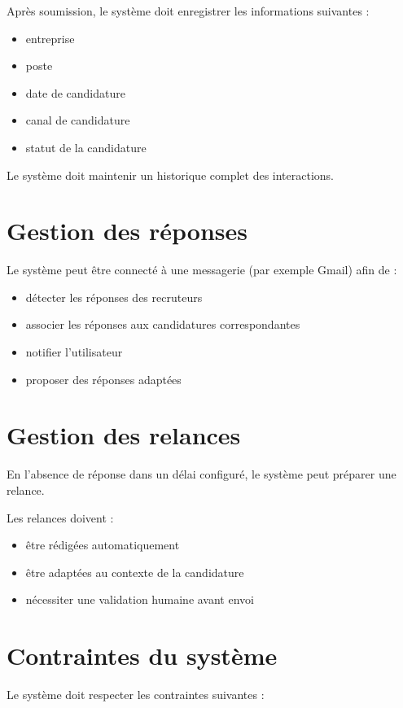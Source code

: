 \documentclass[11pt,a4paper]{article}
\begin{document}
Après soumission, le système doit enregistrer les informations suivantes :

\begin{itemize}
\item entreprise
\item poste
\item date de candidature
\item canal de candidature
\item statut de la candidature
\end{itemize}

Le système doit maintenir un historique complet des interactions.

\section{Gestion des réponses}

Le système peut être connecté à une messagerie (par exemple Gmail) afin de :

\begin{itemize}
\item détecter les réponses des recruteurs
\item associer les réponses aux candidatures correspondantes
\item notifier l’utilisateur
\item proposer des réponses adaptées
\end{itemize}

\section{Gestion des relances}

En l’absence de réponse dans un délai configuré, le système peut préparer une relance.

Les relances doivent :

\begin{itemize}
\item être rédigées automatiquement
\item être adaptées au contexte de la candidature
\item nécessiter une validation humaine avant envoi
\end{itemize}

\section{Contraintes du système}

Le système doit respecter les contraintes suivantes :
\end{document}
